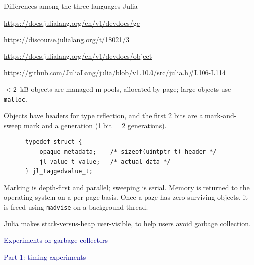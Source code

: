 \documentclass[aspectratio=169]{beamer}
\begin{document}
\begin{frame}[fragile]{Differences among the three languages}
\vspace{0.1 cm}
\Huge
Julia \hfill {\tiny \begin{minipage}{0.8\linewidth}\hfill \textcolor{blue}{\url{https://docs.julialang.org/en/v1/devdocs/gc}}

\hfill \textcolor{blue}{\url{https://discourse.julialang.org/t/18021/3}}

\hfill \textcolor{blue}{\url{https://docs.julialang.org/en/v1/devdocs/object}}

\hfill \textcolor{blue}{\url{https://github.com/JuliaLang/julia/blob/v1.10.0/src/julia.h\#L106-L114}}\end{minipage}}

\vspace{0.25 cm}
\normalsize
$< 2$~kB objects are managed in pools, allocated by page; large objects use \texttt{malloc}.

\vspace{0.2 cm}
Objects have headers for type reflection, and the first 2 bits are a mark-and-sweep mark and a generation (1 bit = 2 generations).

\small
\begin{verbatim}
      typedef struct {
          opaque metadata;    /* sizeof(uintptr_t) header */
          jl_value_t value;   /* actual data */
      } jl_taggedvalue_t;
\end{verbatim}

\vspace{0.2 cm}
\normalsize
Marking is depth-first and parallel; sweeping is serial. Memory is returned to the operating system on a per-page basis. Once a page has zero surviving objects, it is freed using \texttt{madvise} on a background thread.

\vspace{0.2 cm}
Julia makes stack-versus-heap user-visible, to help users avoid garbage collection.
\end{frame}

\begin{frame}{}
\LARGE
\begin{center}
\textcolor{darkblue}{Experiments on garbage collectors}
\end{center}

\large
\vspace{0.5 cm}
\begin{center}
\textcolor{darkblue}{Part 1: timing experiments}
\end{center}
\end{frame}
\end{document}
